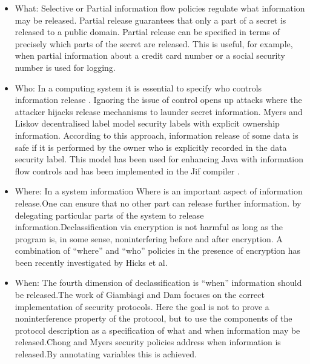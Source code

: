 \begin{itemize}
   \item What: Selective or Partial information flow policies \cite{ref_5_cohen1977information,ref_6_cohen1978information,ref_7_joshi2000semantic,ref_8_giacobazzi2005adjoining} regulate what
   information may be released. Partial release guarantees that only a part of a secret is
   released to a public domain. Partial release can be specified in terms of precisely which
   parts of the secret are released. This is useful,
   for example, when partial information about a credit card number or a social security number is used for logging.
   
   \item Who: In a computing system it is essential to specify who controls information release .
   Ignoring the issue of control opens up attacks where the attacker hijacks release
   mechanisms to launder secret information. Myers and Liskov decentralised label
   model \cite{ref_9_myers1997decentralized} security labels with explicit ownership information. According to this approach, information release of some data is safe if it is performed by the
   owner who is explicitly recorded in the data security label. This model has been used for enhancing Java with information flow controls \cite{ref_10_myers1999jflow} and has been implemented in
   the Jif compiler \cite{ref_11_myers2001jif}.
   
   \item Where: In a system information  Where is an important aspect of information release.One can ensure that no other  part can release further information.
   by delegating particular parts of the system to release information.Declassification
   via encryption is not harmful as long as the program is, in some sense, noninterfering
   before and after encryption.  A combination of \enquote{where} and \enquote{who} policies in the presence of encryption has
   been recently investigated by Hicks et al. \cite{ref_12_hicks2005declassification}
   
   \item When: The fourth dimension of declassification is  \enquote{when} information should be released.The work of Giambiagi and Dam \cite{ref_19_giambiagi2003secure} focuses on the correct implementation of security protocols. Here the goal is not to prove a noninterference property of the protocol, but to use the components of the protocol description as a specification of what and when information may be released.Chong and Myers security policies \cite{ref_13_chong2004security} address when information is released.By annotating variables this is achieved.
   
\end{itemize}

